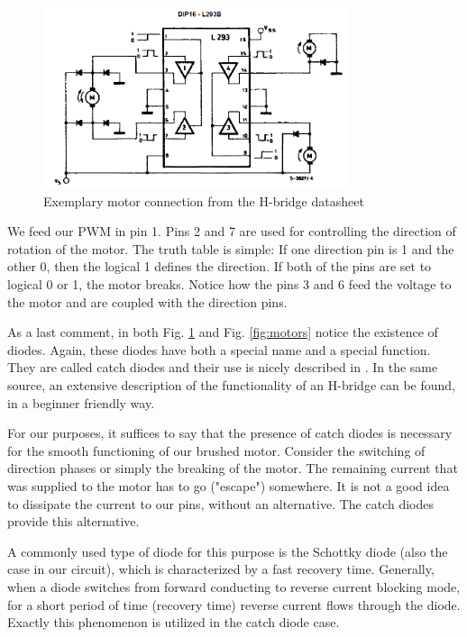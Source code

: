 \begin{figure}[htb]
    \centering
    \includegraphics[width=0.8\textwidth]{figures/hardware/HbridgeDatasheet.PNG}
    \caption{Exemplary motor connection from the H-bridge datasheet}
    \label{fig:HData}
\end{figure}

\FloatBarrier

We feed our PWM in pin 1. Pins 2 and 7 are used for controlling the direction of rotation of the motor. The truth table is simple: If one direction pin is 1 and the other 0, then the logical 1 defines the direction. If both of the pins are set to logical 0 or 1, the motor breaks. Notice how the pins 3 and 6 feed the voltage to the motor and are coupled with the direction pins.

As a last comment, in both Fig. \ref{fig:HData} and Fig. \ref{fig:motors} notice the existence of diodes. Again, these diodes have both a special name and a special function. They are called catch diodes and their use is nicely described in \cite{catchDiodes}. In the same source, an extensive description of the functionality of an H-bridge can be found, in a beginner friendly way.

For our purposes, it suffices to say that the presence of catch diodes is necessary for the smooth functioning of our brushed motor. Consider the switching of direction phases or simply the breaking of the motor. The remaining current that was supplied to the motor has to go ("escape") somewhere. It is not a good idea to dissipate the current to our pins, without an alternative. The catch diodes provide this alternative. 

A commonly used type of diode for this purpose is the Schottky diode (also the case in our circuit), which is characterized by a fast recovery time. Generally, when a diode switches from forward conducting to reverse current blocking mode, for a short period of time (recovery time) reverse current flows through the diode. Exactly this phenomenon is utilized in the catch diode case.

